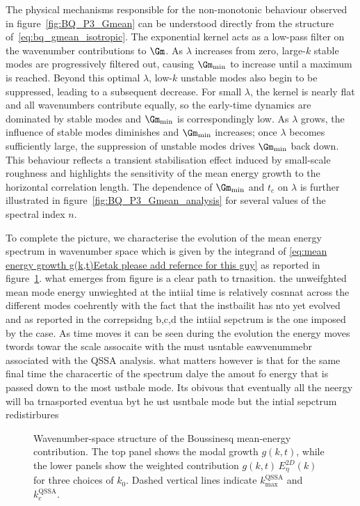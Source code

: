 The physical mechanisms responsible for the non-monotonic behaviour observed in
figure~\ref{fig:BQ_P3_Gmean} can be understood directly from the structure
of~\eqref{eq:bq_gmean_isotropic}. The exponential kernel acts as a low-pass filter on the
wavenumber contributions to \(\Gm\). As \(\lambda\) increases from zero, large-\(k\) stable modes
are progressively filtered out, causing \(\Gm_{\min}\) to increase until a maximum is reached.
Beyond this optimal \(\lambda\), low-\(k\) unstable modes also begin to be suppressed, leading to
a subsequent decrease. For small \(\lambda\), the kernel is nearly flat and all wavenumbers
contribute equally, so the early-time dynamics are dominated by stable modes and \(\Gm_{\min}\)
is correspondingly low. As \(\lambda\) grows, the influence of stable modes diminishes and
\(\Gm_{\min}\) increases; once \(\lambda\) becomes sufficiently large, the suppression of unstable
modes drives \(\Gm_{\min}\) back down. This behaviour reflects a transient stabilisation effect
induced by small-scale roughness and highlights the sensitivity of the mean energy growth to the
horizontal correlation length. The dependence of \(\Gm_{\min}\) and \(t_c\) on \(\lambda\) is
further illustrated in figure~\ref{fig:BQ_P3_Gmean_analysis} for several values of the spectral
index \(n\).

To complete the picture, we characterise the evolution of the mean energy spectrum in wavenumber space which is given by the integrand of \textcolor{red}{\ref{eq:mean energy growth g(k,t)Eetak please add refernce for this guy}}
as reported in figure~\ref{fig:BQ_gkt_weighted_panels}.
what emerges from figure is a clear path to trnasition. the unweifghted mean mode energy unwieghted at the intiial time is relatively cosnnat across the different modes coehrently with the fact that the instbailit has nto yet evolved and as reported in the correpsidng b,c,d the intiial sepctrum is the one imposed by the case. As time moves it can be seen during the evolution the energy moves twords towar the scale assocaite with the must usntable eawvenummebr associated with the QSSA analysis. what matters however is that for the same final time the characertic of the spectrum dalye the amout fo energy that is passed down to the most ustbale mode. Its obivous that eventually all the neergy will ba trnasported eventua byt he ust usntbale mode but the intial sepctrum redistirbures
\begin{figure}[t]
  \centering
  \resizebox{\textwidth}{!}{}
  \caption{Wavenumber-space structure of the Boussinesq mean-energy contribution. The top panel
  shows the modal growth \(g(k,t)\), while the lower panels show the weighted contribution
  \(g(k,t)\,E_{\eta}^{2D}(k)\) for three choices of \(k_0\). Dashed vertical lines indicate
  \(k_{\max}^{\mathrm{QSSA}}\) and \(k_c^{\mathrm{QSSA}}\).}
  \label{fig:BQ_gkt_weighted_panels}
\end{figure}
